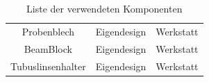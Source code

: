\documentclass[titlepage]{article}
\begin{document}
\begin{table}[h!]
\begin{tabular}{|c|c|c|}
			Probenblech              & Eigendesign                    & Werkstatt                              \\
			BeamBlock                & Eigendesign                    & Werkstatt                              \\
			Tubuslinsenhalter        & Eigendesign                    & Werkstatt                              \\
			\hline          
		\end{tabular}
		\caption{Liste der verwendeten Komponenten}
	\end{table}
	
	
\end{document}
